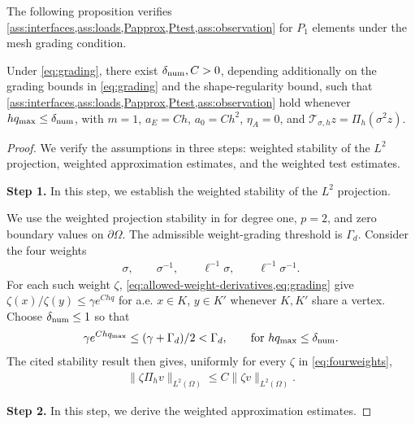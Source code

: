 \documentclass[print,wide,eng]{draft}
\begin{document}
The following proposition verifies \cref{ass:interfaces,ass:loads,Papprox,Ptest,ass:observation} for $P_1$ elements under the mesh grading condition.
%
\begin{proposition}\label{prop:p1}
Under \cref{eq:grading}, there exist $\delta_{\rm num},C>0$, depending additionally on the grading bounds in \cref{eq:grading} and the shape-regularity bound, such that \cref{ass:interfaces,ass:loads,Papprox,Ptest,ass:observation} hold whenever $hq_{\max}\leq\delta_{\rm num}$, with $m=1$, $a_E=Ch$, $a_0=Ch^2$, $\eta_A=0$, and $\mathscr{T}_{\sigma,h}z=\Pi_h(\sigma^2z)$.
\end{proposition}
%
\begin{proof}
We verify the assumptions in three steps: weighted stability of the $L^2$ projection, weighted approximation estimates, and the weighted test estimates.

{\bf Step 1.} In this step, we establish the weighted stability of the $L^2$ projection.

We use the weighted projection stability in \cite[Theorems~4.4 and~4.14(i), Remark~4.5]{DST} for degree one, $p=2$, and zero boundary values on $\partial\Omega$. The admissible weight-grading threshold is $\Gamma_d$. Consider the four weights\vspace{-3mm}
%
\begin{align}\label{eq:fourweights}
\sigma,\qquad\sigma^{-1},\qquad\ell^{-1}\sigma,\qquad\ell^{-1}\sigma^{-1}.
\end{align}
%
For each such weight $\zeta$, \cref{eq:allowed-weight-derivatives,eq:grading} give $\zeta(x)/\zeta(y)\leq\gamma e^{Chq}$ for a.e. $x\in K$, $y\in K'$ whenever $K,K'$ share a vertex. Choose $\delta_{\rm num}\leq1$ so that
$$\gamma e^{Chq_{\max}}\leq(\gamma+\Gamma_d)/2<\Gamma_d,\qquad \mbox{for }hq_{\max}\leq\delta_{\rm num}.$$
The cited stability result then gives, uniformly for every $\zeta$ in \cref{eq:fourweights},
%
\begin{align}\label{eq:p1-weighted-projection}
\|\zeta\Pi_hv\|_{L^2(\Omega)}\leq C\|\zeta v\|_{L^2(\Omega)}.
\end{align}
%

{\bf Step 2.} In this step, we derive the weighted approximation estimates.


\end{proof}
\end{document}
